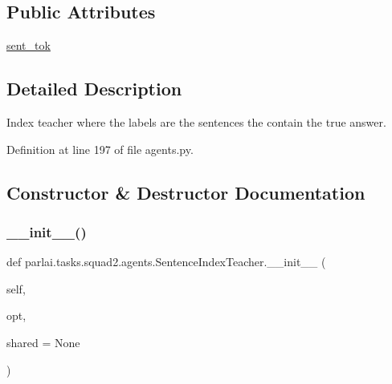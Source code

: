 \subsection*{Public Attributes}
\begin{DoxyCompactItemize}
\item 
\hyperlink{classparlai_1_1tasks_1_1squad2_1_1agents_1_1SentenceIndexTeacher_ac9b01a4a40b5a1a6de68d24e075a22fb}{sent\+\_\+tok}
\end{DoxyCompactItemize}


\subsection{Detailed Description}
\begin{DoxyVerb}Index teacher where the labels are the sentences the contain the true answer.
\end{DoxyVerb}
 

Definition at line 197 of file agents.\+py.



\subsection{Constructor \& Destructor Documentation}
\mbox{\label{classparlai_1_1tasks_1_1squad2_1_1agents_1_1SentenceIndexTeacher_ab4c46deb33f625365691be6b36f15a03}} 
\subsubsection{\texorpdfstring{\+\_\+\+\_\+init\+\_\+\+\_\+()}{\_\_init\_\_()}}
{\footnotesize\ttfamily def parlai.\+tasks.\+squad2.\+agents.\+Sentence\+Index\+Teacher.\+\_\+\+\_\+init\+\_\+\+\_\+ (\begin{DoxyParamCaption}\item[{}]{self,  }\item[{}]{opt,  }\item[{}]{shared = {\ttfamily None} }\end{DoxyParamCaption})}



